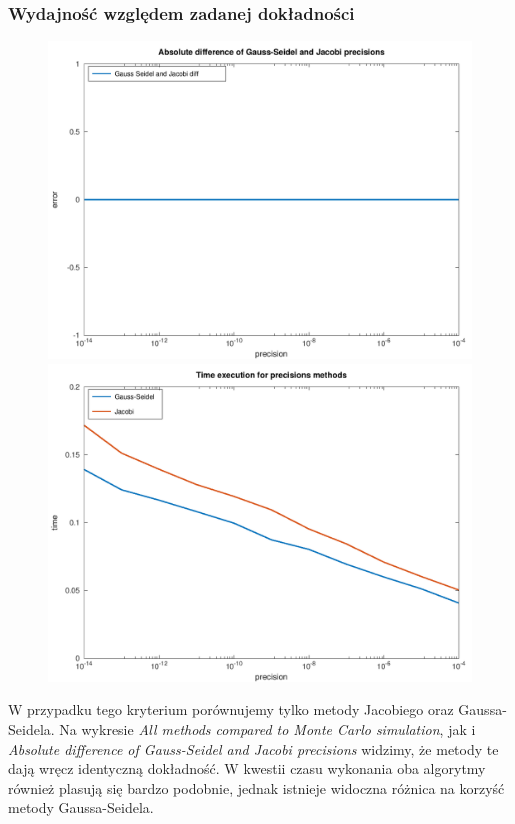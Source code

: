 \documentclass[10pt]{article}
\begin{document}
\subsubsection{Wydajność względem zadanej dokładności}
\begin{figure}[h]
\centering
\includegraphics[scale=0.45]{plots/05_abs_precision_methods_all_rows.png}
\includegraphics[scale=0.45]{plots/06_time_precision_methods_all_rows.png}
\end{figure}
W przypadku tego kryterium porównujemy tylko metody Jacobiego oraz Gaussa-Seidela.
Na wykresie \textit{All methods compared to Monte Carlo simulation}, jak i \textit{Absolute difference of Gauss-Seidel and Jacobi precisions} widzimy, że metody te dają wręcz identyczną dokładność.
W kwestii czasu wykonania oba algorytmy również plasują się bardzo podobnie, jednak istnieje widoczna różnica na korzyść metody Gaussa-Seidela.
\end{document}
